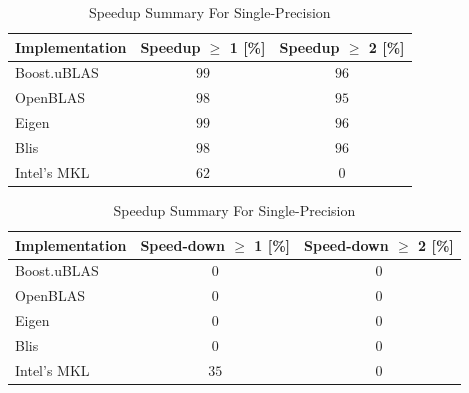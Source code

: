 \begin{table}[ht]
    \centering
    \caption{Speedup Summary For Single-Precision}
    \begin{tabular}{|l|c|c|}
        \hline
        \textbf{Implementation} & \textbf{Speedup $\geq$ 1 [\%]} & \textbf{Speedup $\geq$ 2 [\%]}\\
        \hline
        Boost.uBLAS & $99$ & $96$ \\
        \hline
        OpenBLAS    & $98$ & $95$ \\
        \hline
        Eigen       & $99$ & $96$ \\
        \hline
        Blis        & $98$ & $96$ \\
        \hline
        Intel's MKL & $62$ & $0$ \\
        \hline
    \end{tabular}
    \newline
    \vspace*{1 cm}
    \newline
    \begin{tabular}{|l|c|c|}
        \hline
        \textbf{Implementation} & \textbf{Speed-down $\geq$ 1 [\%]} & \textbf{Speed-down $\geq$ 2 [\%]}\\
        \hline
        Boost.uBLAS & $0$ & $0$ \\
        \hline
        OpenBLAS    & $0$ & $0$ \\
        \hline
        Eigen       & $0$ & $0$ \\
        \hline
        Blis        & $0$ & $0$ \\
        \hline
        Intel's MKL & $35$ & $0$ \\
        \hline
    \end{tabular}
\end{table}

